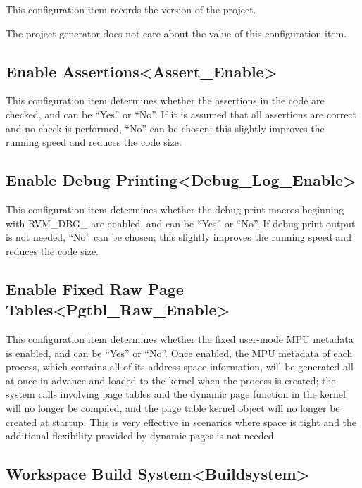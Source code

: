 This configuration item records the version of the project.

The project generator does not care about the value of this configuration item.

\subsection{Enable Assertions<Assert\_Enable>{}}\label{subsec:5-3-3}

This configuration item determines whether the assertions in the code are checked, and can be ``Yes'' or ``No''. If it is assumed that all assertions are correct and no check is performed, ``No'' can be chosen; this slightly improves the running speed and reduces the code size.

\subsection{Enable Debug Printing<Debug\_Log\_Enable>{}}\label{subsec:5-3-4}

This configuration item determines whether the debug print macros beginning with RVM\_DBG\_ are enabled, and can be ``Yes'' or ``No''. If debug print output is not needed, ``No'' can be chosen; this slightly improves the running speed and reduces the code size.

\subsection{Enable Fixed Raw Page Tables<Pgtbl\_Raw\_Enable>{}}\label{subsec:5-3-5}

This configuration item determines whether the fixed user-mode MPU metadata is enabled, and can be ``Yes'' or ``No''. Once enabled, the MPU metadata of each process, which contains all of its address space information, will be generated all at once in advance and loaded to the kernel when the process is created; the system calls involving page tables and the dynamic page function in the kernel will no longer be compiled, and the page table kernel object will no longer be created at startup. This is very effective in scenarios where space is tight and the additional flexibility provided by dynamic pages is not needed.

\subsection{Workspace Build System<Buildsystem>{}}\label{subsec:5-3-6}

